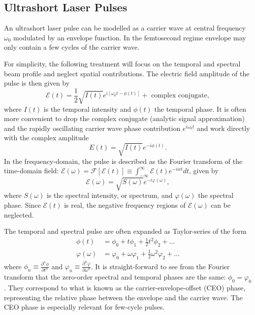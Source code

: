 \documentclass[a4paper]{jpconf}
\begin{document}
\subsection{Ultrashort Laser Pulses}
An ultrashort laser pulse can be modelled as a carrier wave at central frequency $\omega_0$ modulated by an envelope function. In the femtosecond regime envelope may only contain a few cycles of the carrier wave. \par 
For simplicity, the following treatment will focus on the temporal and spectral beam profile and neglect spatial contributions. The electric field amplitude of the pulse is then given by 
\begin{equation}
\mathcal{E}(t)= \frac{1}{2} \sqrt{I(t)} e^{i [\omega_0 t - \phi(t)]} + \text{ complex conjugate},
\end{equation}
where $I(t)$ is the temporal intensity and $\phi(t)$ the temporal phase. It is often more convenient to drop the complex conjugate (analytic signal approximation) and the rapidly oscillating carrier wave phase contribution $e^{i \omega_0 t}$ and work directly with the complex amplitude
\begin{equation}
E(t) = \sqrt{I(t)}e^{- i \phi(t)}.
\end{equation}
In the frequency-domain, the pulse is described as the Fourier transform of the time-domain field: $\mathcal{E}(\omega) = \mathcal{F}[\mathcal{E}(t)] \equiv \int_{-\infty}^\infty \mathcal{E}(t) e^{-iwt} dt$, given by 
\begin{equation}
\mathcal{E}(\omega) = \sqrt{S(\omega)} e^{-i \varphi(\omega)},
\end{equation}
where $S(\omega)$ is the spectral intensity, or spectrum, and $\varphi(\omega)$ the spectral phase. Since $\mathcal{E}(t)$ is real, the negative frequency regions of $\mathcal{E}(\omega)$ can be neglected. \par 
The temporal and spectral pulse are often expanded as Taylor-series of the form 
\begin{align}
\phi(t) &= \phi_0 + t \phi_1 + \frac{1}{2} t^2 \phi_2 + ...  \\
\varphi(\omega) &= \varphi_0 + \omega \varphi_1 + \frac{1}{2} \omega^2 \varphi_2 + ...
\end{align}
where $\phi_n \equiv \frac{\partial^n \phi}{\partial t^n}$ and $\varphi_n \equiv \frac{\partial^n \varphi}{\partial \omega^n}$. It is straight-forward to see from the Fourier transform that the zero-order spectral and temporal phases are the same: $\phi_0 = \varphi_0$. They correspond to what is known as the carrier-envelope-offset (CEO) phase, representing the relative phase between the envelope and the carrier wave. The CEO phase is especially relevant for few-cycle pulses. \par 
\end{document}

